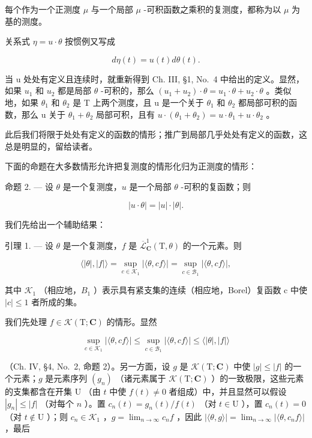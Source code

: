 每个作为一个正测度 \(\mu\) 与一个局部 \(\mu\) -可积函数之乘积的复测度，都称为以 \(\mu\) 为基的测度。

关系式 \(\eta = u \cdot \theta\) 按惯例又写成

\[
d \eta (t) = u (t) d \theta (t).
\]

当 u 处处有定义且连续时，就重新得到 Ch. III, §1, No.~4 中给出的定义。显然，如果 \(u_{1}\) 和 \(u_{2}\) 都是局部 \(\theta\) -可积的，那么 \((u_{1}+u_{2})\cdot\theta=u_{1}\cdot\theta+u_{2}\cdot\theta\) 。类似地，如果 \(\theta_{1}\) 和 \(\theta_{2}\) 是 T 上两个测度，且 u 是一个关于 \(\theta_{1}\) 和 \(\theta_{2}\) 都局部可积的函数，那么 u 关于 \(\theta_{1}+\theta_{2}\) 局部可积，且有 \(u\cdot(\theta_{1}+\theta_{2})=u\cdot\theta_{1}+u\cdot\theta_{2}\) 。

此后我们将限于处处有定义的函数的情形；推广到局部几乎处处有定义的函数，这总是明显的，留给读者。

下面的命题在大多数情形允许把复测度的情形化归为正测度的情形：

命题 2. --- 设 \(\theta\) 是一个复测度，\(u\) 是一个局部 \(\theta\) -可积的复函数；则

\[
\left| u \cdot \theta \right| = \left| u \right| \cdot \left| \theta \right|.\tag{3}
\]

我们先给出一个辅助结果：

引理 1. --- 设 \(\theta\) 是一个复测度，\(f\) 是 \(\overline{\mathcal{L}}_{\mathbf{C}}^{1}(\mathrm{T},\theta)\) 的一个元素。则

\[
\langle | \theta |, | f | \rangle = \sup _ {c \in \mathcal {K} _ {1}} | \langle \theta , c f \rangle | = \sup _ {c \in \mathcal {B} _ {1}} | \langle \theta , c f \rangle |,\tag{4}
\]

其中 \(\mathcal{K}_{1}\) （相应地，\(B_{1}\) ）表示具有紧支集的连续（相应地，Borel）复函数 c 中使 \(|c| \leqslant 1\) 者所成的集。

我们先处理 \(f \in \mathcal{K}(\mathrm{T};\mathbf{C})\) 的情形。显然

\[
\sup _ {c \in \mathcal {K} _ {1}} | \langle \theta , c f \rangle | \leqslant \sup _ {c \in \mathcal {B} _ {1}} | \langle \theta , c f \rangle | \leqslant \langle | \theta |, | f | \rangle
\]

（Ch. IV, §4, No.~2, 命题 2）。另一方面，设 \(g\) 是 \(\mathcal{K}(\mathrm{T};\mathbf{C})\) 中使 \(|g| \leqslant |f|\) 的一个元素；\(g\) 是元素序列 \((g_n)\) （诸元素属于 \(\mathcal{K}(\mathrm{T};\mathbf{C})\) ）的一致极限，这些元素的支集都含在开集 \(\mathrm{U}\) （由 \(t\) 中使 \(f(t) \neq 0\) 者组成）中，并且显然可以假设 \(|g_n| \leqslant |f|\) （对每个 \(n\) ）。置 \(c_n(t) = g_n(t)/f(t)\) （对 \(t \in \mathrm{U}\) ），置 \(c_n(t) = 0\) （对 \(t \notin \mathrm{U}\) ）；则 \(c_n \in \mathcal{K}_1\) ，\(g = \lim_{n \to \infty} c_n f\) ，因此 \(|\langle \theta, g \rangle| = \lim_{n \to \infty} |\langle \theta, c_n f \rangle|\) ，最后

